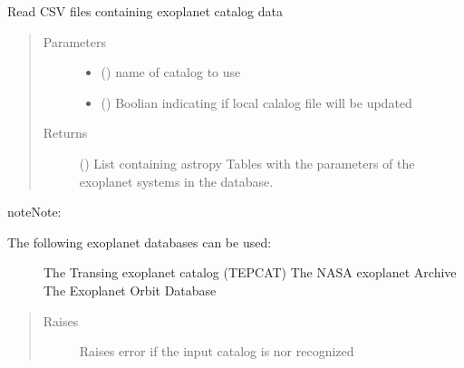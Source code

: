 \documentclass[a4paper,11pt,english]{sphinxmanual}
\begin{document}
\begin{fulllineitems}
\label{\detokenize{cascade.exoplanet_tools:cascade.exoplanet_tools.exoplanet_tools.parse_database}}
Read CSV files containing exoplanet catalog data
\begin{quote}\begin{description}
\item[{Parameters}] \leavevmode\begin{itemize}
\item {} 
 () \textendash{} name of catalog to use

\item {} 
 () \textendash{} Boolian indicating if local calalog file will be updated

\end{itemize}

\item[{Returns}] \leavevmode
{} () \textendash{} List containing astropy Tables with the parameters of the exoplanet
systems in the database.

\end{description}\end{quote}

\begin{sphinxadmonition}{note}{Note:}\begin{description}
\item[{The following exoplanet databases can be used:}] \leavevmode
The Transing exoplanet catalog (TEPCAT)
The NASA exoplanet Archive
The Exoplanet Orbit Database

\end{description}
\end{sphinxadmonition}
\begin{quote}\begin{description}
\item[{Raises}] \leavevmode
{} \textendash{} Raises error if the input catalog is nor recognized

\end{description}\end{quote}

\end{fulllineitems}
\end{document}
